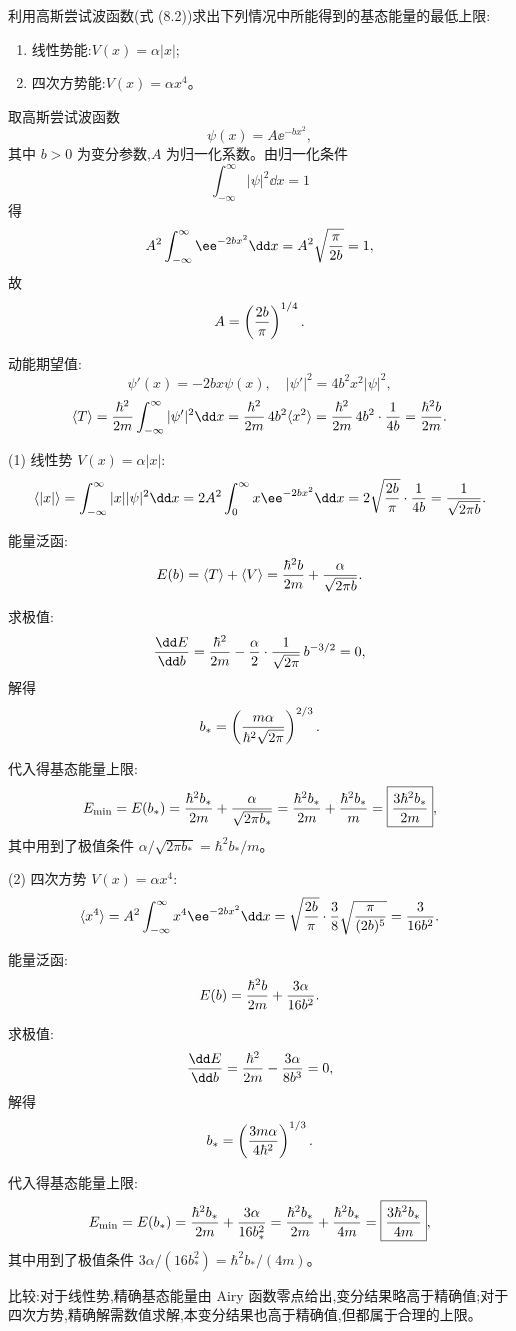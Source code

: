 \begin{question}
利用高斯尝试波函数(式 (8.2))求出下列情况中所能得到的基态能量的最低上限:
\begin{enumerate}
\item 线性势能:$V(x)=\alpha |x|$;
\item 四次方势能:$V(x)=\alpha x^4$。
\end{enumerate}

\par\smallskip
{}

\end{question}
\begin{solution}
取高斯尝试波函数
\[
\psi(x)=A \ee^{-b x^2},
\]
其中 $b>0$ 为变分参数,$A$ 为归一化系数。由归一化条件
\[
\int_{-\infty}^\infty|\psi|^2\dd x=1
\]
得
\[
A^2\int_{-\infty}^\infty \ee^{-2b x^2}\dd x
=A^2\sqrt{\pi\over2b}=1,
\]
故
\[
A=\left({2b\over\pi}\right)^{1/4}.
\]

动能期望值:
\[
\psi'(x)=-2b x\psi(x),\quad |\psi'|^2=4b^2x^2|\psi|^2,
\]
\[
\langle T\rangle={\hbar^2\over2m}\int_{-\infty}^\infty|\psi'|^2\dd x
={\hbar^2\over2m}\,4b^2\langle x^2\rangle
={\hbar^2\over2m}\,4b^2\cdot{1\over4b}
={\hbar^2 b\over2m}.
\]

(1) 线性势 $V(x)=\alpha|x|$:
\[
\langle |x|\rangle = \int_{-\infty}^\infty|x||\psi|^2\dd x
=2A^2\int_0^\infty x \ee^{-2b x^2}\dd x
=2\sqrt{2b\over\pi}\cdot{1\over4b}
={1\over\sqrt{2\pi b}}.
\]

能量泛函:
\[
E(b)=\langle T\rangle+\langle V\rangle
={\hbar^2 b\over2m}+{\alpha\over\sqrt{2\pi b}}.
\]

求极值:
\[
{\dd E\over\dd b}={\hbar^2\over2m}-{\alpha\over2}\cdot{1\over\sqrt{2\pi}}\,b^{-3/2}=0,
\]
解得
\[
b_*=\left({m\alpha\over\hbar^2\sqrt{2\pi}}\right)^{2/3}.
\]

代入得基态能量上限:
\[
E_{\min}=E(b_*)={\hbar^2 b_*\over2m}+{\alpha\over\sqrt{2\pi b_*}}
={\hbar^2 b_*\over2m}+{\hbar^2 b_*\over m}
=\boxed{{3\hbar^2 b_*\over2m}},
\]
其中用到了极值条件 $\alpha/\sqrt{2\pi b_*}=\hbar^2 b_*/m$。

(2) 四次方势 $V(x)=\alpha x^4$:
\[
\langle x^4\rangle = A^2\int_{-\infty}^\infty x^4 \ee^{-2b x^2}\dd x
=\sqrt{2b\over\pi}\cdot{3\over8}\sqrt{\pi\over(2b)^5}
={3\over16b^2}.
\]

能量泛函:
\[
E(b)={\hbar^2 b\over2m}+{3\alpha\over16b^2}.
\]

求极值:
\[
{\dd E\over\dd b}={\hbar^2\over2m}-{3\alpha\over8b^3}=0,
\]
解得
\[
b_*=\left({3m\alpha\over4\hbar^2}\right)^{1/3}.
\]

代入得基态能量上限:
\[
E_{\min}=E(b_*)={\hbar^2 b_*\over2m}+{3\alpha\over16b_*^2}
={\hbar^2 b_*\over2m}+{\hbar^2 b_*\over4m}
=\boxed{{3\hbar^2 b_*\over4m}},
\]
其中用到了极值条件 $3\alpha/(16b_*^2)=\hbar^2 b_*/(4m)$。

比较:对于线性势,精确基态能量由 Airy 函数零点给出,变分结果略高于精确值;对于四次方势,精确解需数值求解,本变分结果也高于精确值,但都属于合理的上限。
\end{solution}

